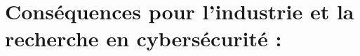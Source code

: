 \chapter{Conséquences pour l'industrie et la recherche en cybersécurité : }
    \section{}
        \subsection{}
            \subsubsection{}
